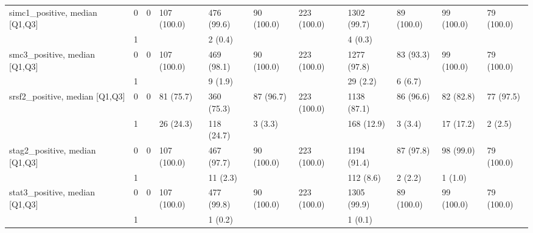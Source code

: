 \begin{tabular}{lllllllllll}
simc1\_positive, median [Q1,Q3] & 0 &                    0 &         107 (100.0) &         476 (99.6) &           90 (100.0) &         223 (100.0) &       1302 (99.7) &        89 (100.0) &          99 (100.0) &           79 (100.0) \\
                 & 1 &                      &                     &            2 (0.4) &                      &                     &           4 (0.3) &                   &                     &                      \\
smc3\_positive, median [Q1,Q3] & 0 &                    0 &         107 (100.0) &         469 (98.1) &           90 (100.0) &         223 (100.0) &       1277 (97.8) &         83 (93.3) &          99 (100.0) &           79 (100.0) \\
                 & 1 &                      &                     &            9 (1.9) &                      &                     &          29 (2.2) &           6 (6.7) &                     &                      \\
srsf2\_positive, median [Q1,Q3] & 0 &                    0 &           81 (75.7) &         360 (75.3) &            87 (96.7) &         223 (100.0) &       1138 (87.1) &         86 (96.6) &           82 (82.8) &            77 (97.5) \\
                 & 1 &                      &           26 (24.3) &         118 (24.7) &              3 (3.3) &                     &        168 (12.9) &           3 (3.4) &           17 (17.2) &              2 (2.5) \\
stag2\_positive, median [Q1,Q3] & 0 &                    0 &         107 (100.0) &         467 (97.7) &           90 (100.0) &         223 (100.0) &       1194 (91.4) &         87 (97.8) &           98 (99.0) &           79 (100.0) \\
                 & 1 &                      &                     &           11 (2.3) &                      &                     &         112 (8.6) &           2 (2.2) &             1 (1.0) &                      \\
stat3\_positive, median [Q1,Q3] & 0 &                    0 &         107 (100.0) &         477 (99.8) &           90 (100.0) &         223 (100.0) &       1305 (99.9) &        89 (100.0) &          99 (100.0) &           79 (100.0) \\
                 & 1 &                      &                     &            1 (0.2) &                      &                     &           1 (0.1) &                   &                     &                      \\

\end{tabular}
